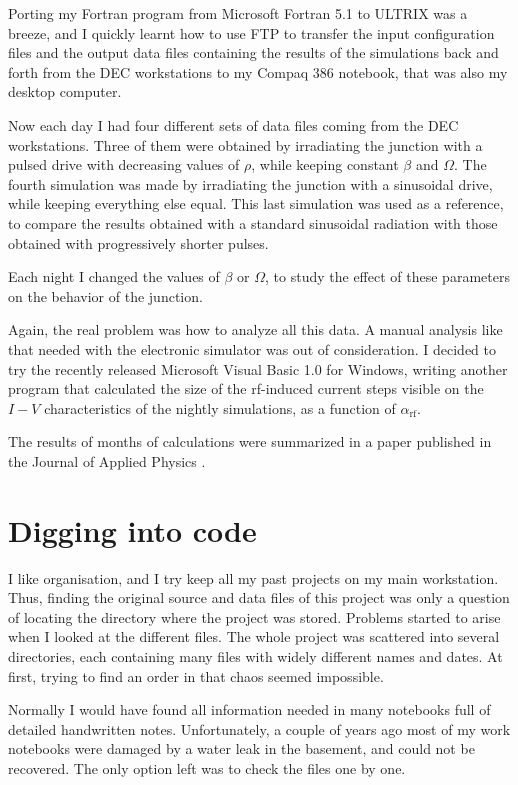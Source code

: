 Porting my Fortran program from Microsoft Fortran 5.1 to ULTRIX was a breeze, and I quickly learnt how to use FTP to transfer the input configuration files and the output data files containing the results of the simulations back and forth from the DEC workstations to my Compaq 386 notebook, that was also my desktop computer.

Now each day I had four different sets of data files coming from the DEC workstations. Three of them were obtained by irradiating the junction with a pulsed drive with decreasing values of $\rho$, while keeping constant $\beta$ and $\Omega$.
The fourth simulation was made by irradiating the junction with a sinusoidal drive, while keeping everything else equal. This last simulation was used as a reference, to compare the results obtained with a standard sinusoidal radiation with those obtained with progressively shorter pulses.

Each night I changed the values of $\beta$ or $\Omega$, to study the effect of these parameters on the behavior of the junction.

Again, the real problem was how to analyze all this data. A manual analysis like that needed with the electronic simulator was out of consideration. 
I decided to try the recently released Microsoft Visual Basic 1.0 for Windows, writing another program that calculated the size of the rf-induced current steps visible on the $I-V$ characteristics of the nightly simulations, as a function of $\alpha_\mathrm{rf}$.

The results of months of calculations were summarized in a paper published in the Journal of Applied Physics \cite{Maggi:1996}.



\section{Digging into code} \label{sec:digging-into-code}

I like organisation, and I try keep all my past projects on my main workstation. 
Thus, finding the original source and data files of this project was only a question of locating the directory where the project was stored.
Problems started to arise when I looked at the different files. The whole project was scattered into several directories, each containing many files with widely different names and dates. At first, trying to find an order in that chaos seemed impossible.

Normally I would have found all information needed in many notebooks full of detailed handwritten notes.
Unfortunately, a couple of years ago most of my work notebooks were damaged by a water leak in the basement, and could not be recovered. The only option left was to check the files one by one. 

